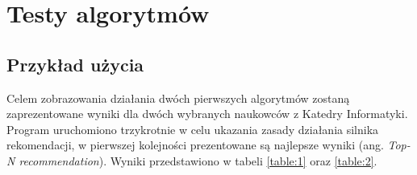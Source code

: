 \chapter{Testy algorytmów}
\thispagestyle{chapterBeginStyle}

\section{Przykład użycia}

Celem zobrazowania działania dwóch pierwszych algorytmów zostaną zaprezentowane wyniki dla dwóch wybranych naukowców z Katedry Informatyki. Program uruchomiono trzykrotnie w celu ukazania zasady działania silnika rekomendacji, w pierwszej kolejności prezentowane są najlepsze wyniki (ang. \textit{Top-N recommendation}). Wyniki przedstawiono w tabeli \ref{table:1} oraz \ref{table:2}.

